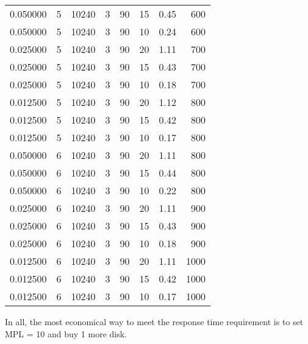 \documentclass[12pt,letterpaper]{article}
\begin{document}
\begin{center}
\begin{longtable}{r|r|r|r|r|r|r|r}
0.050000 & 5 & 10240 & 3 & 90 & 15 & 0.45 & 600 \\
0.050000 & 5 & 10240 & 3 & 90 & 10 & 0.24 & 600 \\
0.025000 & 5 & 10240 & 3 & 90 & 20 & 1.11 & 700 \\
0.025000 & 5 & 10240 & 3 & 90 & 15 & 0.43 & 700 \\
0.025000 & 5 & 10240 & 3 & 90 & 10 & 0.18 & 700 \\
0.012500 & 5 & 10240 & 3 & 90 & 20 & 1.12 & 800 \\
0.012500 & 5 & 10240 & 3 & 90 & 15 & 0.42 & 800 \\
0.012500 & 5 & 10240 & 3 & 90 & 10 & 0.17 & 800 \\
0.050000 & 6 & 10240 & 3 & 90 & 20 & 1.11 & 800 \\
0.050000 & 6 & 10240 & 3 & 90 & 15 & 0.44 & 800 \\
0.050000 & 6 & 10240 & 3 & 90 & 10 & 0.22 & 800 \\
0.025000 & 6 & 10240 & 3 & 90 & 20 & 1.11 & 900 \\
0.025000 & 6 & 10240 & 3 & 90 & 15 & 0.43 & 900 \\
0.025000 & 6 & 10240 & 3 & 90 & 10 & 0.18 & 900 \\
0.012500 & 6 & 10240 & 3 & 90 & 20 & 1.11 & 1000 \\
0.012500 & 6 & 10240 & 3 & 90 & 15 & 0.42 & 1000 \\
0.012500 & 6 & 10240 & 3 & 90 & 10 & 0.17 & 1000 \\
\end{longtable}
\end{center}
In all, the most economical way to meet the response time requirement is to set MPL = 10 and buy 1 more disk.
\end{document}
